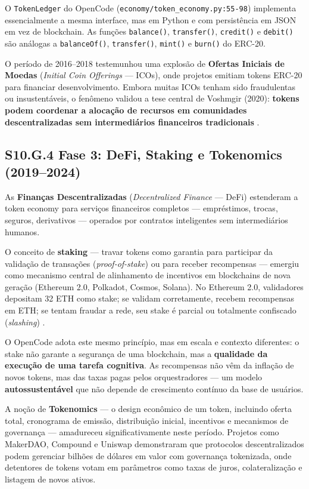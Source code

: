O \texttt{TokenLedger} do OpenCode (\texttt{economy/token\_economy.py:55-98}) implementa essencialmente a mesma interface, mas em Python e com persistência em JSON em vez de blockchain. As funções \texttt{balance()}, \texttt{transfer()}, \texttt{credit()} e \texttt{debit()} são análogas a \texttt{balanceOf()}, \texttt{transfer()}, \texttt{mint()} e \texttt{burn()} do ERC-20.

O período de 2016--2018 testemunhou uma explosão de \textbf{Ofertas Iniciais de Moedas} (\textit{Initial Coin Offerings} --- ICOs), onde projetos emitiam tokens ERC-20 para financiar desenvolvimento. Embora muitas ICOs tenham sido fraudulentas ou insustentáveis, o fenômeno validou a tese central de Voshmgir (2020): \textbf{tokens podem coordenar a alocação de recursos em comunidades descentralizadas sem intermediários financeiros tradicionais} \cite{voshmgir2020token}.

\subsection*{S10.G.4 Fase 3: DeFi, Staking e Tokenomics (2019--2024)}

As \textbf{Finanças Descentralizadas} (\textit{Decentralized Finance} --- DeFi) estenderam a token economy para serviços financeiros completos --- empréstimos, trocas, seguros, derivativos --- operados por contratos inteligentes sem intermediários humanos.

O conceito de \textbf{staking} --- travar tokens como garantia para participar da validação de transações (\textit{proof-of-stake}) ou para receber recompensas --- emergiu como mecanismo central de alinhamento de incentivos em blockchains de nova geração (Ethereum 2.0, Polkadot, Cosmos, Solana). No Ethereum 2.0, validadores depositam 32 ETH como stake; se validam corretamente, recebem recompensas em ETH; se tentam fraudar a rede, seu stake é parcial ou totalmente confiscado (\textit{slashing}) \cite{buterin2020ethereum}.

O OpenCode adota este mesmo princípio, mas em escala e contexto diferentes: o stake não garante a segurança de uma blockchain, mas a \textbf{qualidade da execução de uma tarefa cognitiva}. As recompensas não vêm da inflação de novos tokens, mas das taxas pagas pelos orquestradores --- um modelo \textbf{autossustentável} que não depende de crescimento contínuo da base de usuários.

A noção de \textbf{Tokenomics} --- o design econômico de um token, incluindo oferta total, cronograma de emissão, distribuição inicial, incentivos e mecanismos de governança --- amadureceu significativamente neste período. Projetos como MakerDAO, Compound e Uniswap demonstraram que protocolos descentralizados podem gerenciar bilhões de dólares em valor com governança tokenizada, onde detentores de tokens votam em parâmetros como taxas de juros, colateralização e listagem de novos ativos.

